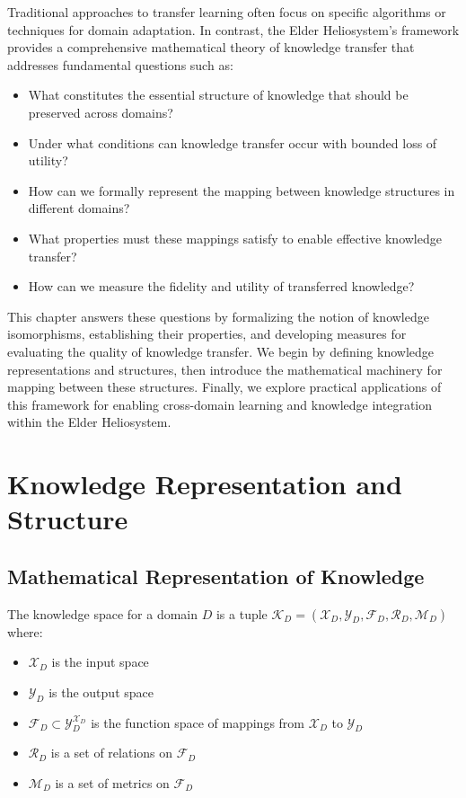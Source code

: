 Traditional approaches to transfer learning often focus on specific algorithms or techniques for domain adaptation. In contrast, the Elder Heliosystem's framework provides a comprehensive mathematical theory of knowledge transfer that addresses fundamental questions such as:

\begin{itemize}
    \item What constitutes the essential structure of knowledge that should be preserved across domains?
    \item Under what conditions can knowledge transfer occur with bounded loss of utility?
    \item How can we formally represent the mapping between knowledge structures in different domains?
    \item What properties must these mappings satisfy to enable effective knowledge transfer?
    \item How can we measure the fidelity and utility of transferred knowledge?
\end{itemize}

This chapter answers these questions by formalizing the notion of knowledge isomorphisms, establishing their properties, and developing measures for evaluating the quality of knowledge transfer. We begin by defining knowledge representations and structures, then introduce the mathematical machinery for mapping between these structures. Finally, we explore practical applications of this framework for enabling cross-domain learning and knowledge integration within the Elder Heliosystem.

\section{Knowledge Representation and Structure}

\subsection{Mathematical Representation of Knowledge}

\begin{definition}
The knowledge space for a domain $D$ is a tuple $\mathcal{K}_D = (\mathcal{X}_D, \mathcal{Y}_D, \mathcal{F}_D, \mathcal{R}_D, \mathcal{M}_D)$ where:
\begin{itemize}
    \item $\mathcal{X}_D$ is the input space
    \item $\mathcal{Y}_D$ is the output space
    \item $\mathcal{F}_D \subset \mathcal{Y}_D^{\mathcal{X}_D}$ is the function space of mappings from $\mathcal{X}_D$ to $\mathcal{Y}_D$
    \item $\mathcal{R}_D$ is a set of relations on $\mathcal{F}_D$
    \item $\mathcal{M}_D$ is a set of metrics on $\mathcal{F}_D$
\end{itemize}
\end{definition}

